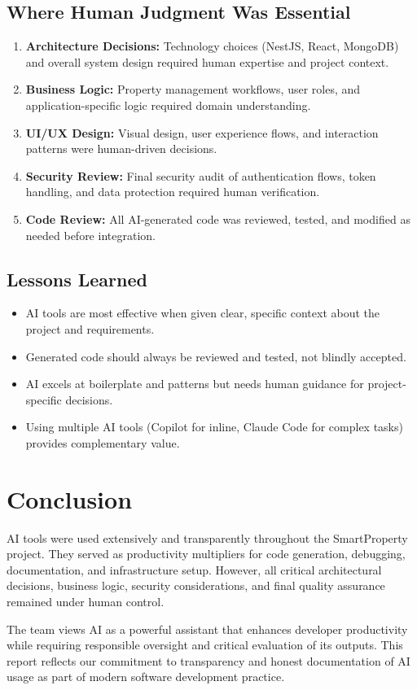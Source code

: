 \documentclass[12pt,a4paper]{article}
\begin{document}
\subsection{Where Human Judgment Was Essential}

\begin{enumerate}[noitemsep]
    \item \textbf{Architecture Decisions:} Technology choices (NestJS, React, MongoDB) and overall system design required human expertise and project context.
    \item \textbf{Business Logic:} Property management workflows, user roles, and application-specific logic required domain understanding.
    \item \textbf{UI/UX Design:} Visual design, user experience flows, and interaction patterns were human-driven decisions.
    \item \textbf{Security Review:} Final security audit of authentication flows, token handling, and data protection required human verification.
    \item \textbf{Code Review:} All AI-generated code was reviewed, tested, and modified as needed before integration.
\end{enumerate}

\subsection{Lessons Learned}

\begin{itemize}[noitemsep]
    \item AI tools are most effective when given clear, specific context about the project and requirements.
    \item Generated code should always be reviewed and tested, not blindly accepted.
    \item AI excels at boilerplate and patterns but needs human guidance for project-specific decisions.
    \item Using multiple AI tools (Copilot for inline, Claude Code for complex tasks) provides complementary value.
\end{itemize}

\section{Conclusion}

AI tools were used extensively and transparently throughout the SmartProperty project. They served as productivity multipliers for code generation, debugging, documentation, and infrastructure setup. However, all critical architectural decisions, business logic, security considerations, and final quality assurance remained under human control.

The team views AI as a powerful assistant that enhances developer productivity while requiring responsible oversight and critical evaluation of its outputs. This report reflects our commitment to transparency and honest documentation of AI usage as part of modern software development practice.
\end{document}
